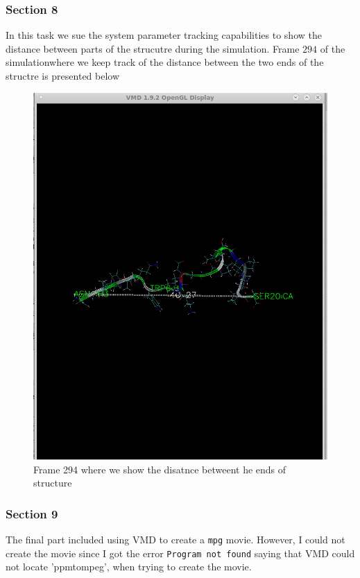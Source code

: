 \documentclass[11pt]{article}
\makeatletter
\def\maxwidth{\ifdim\Gin@nat@width>\linewidth\linewidth
    \else\Gin@nat@width\fi}
\let\Oldincludegraphics\includegraphics
\renewcommand{\includegraphics}[1]{\Oldincludegraphics[width=.8\maxwidth]{#1}}
\makeatother
\begin{document}
\subsubsection{Section 8}\label{section-8}

In this task we sue the system parameter tracking capabilities to show
the distance between parts of the strucutre during the simulation. Frame
\(294\) of the simulationwhere we keep track of the distance between the
two ends of the structre is presented below

\begin{figure}
\centering
\includegraphics{Screenshot_dist_ends.png}
\caption{Frame 294 where we show the disatnce betweent he ends of
structure}
\end{figure}

\subsubsection{Section 9}\label{section-9}

The final part included using VMD to create a \texttt{mpg} movie.
However, I could not create the movie since I got the error
\texttt{Program\ not\ found} saying that VMD could not locate
'ppmtompeg', when trying to create the movie.
\end{document}
